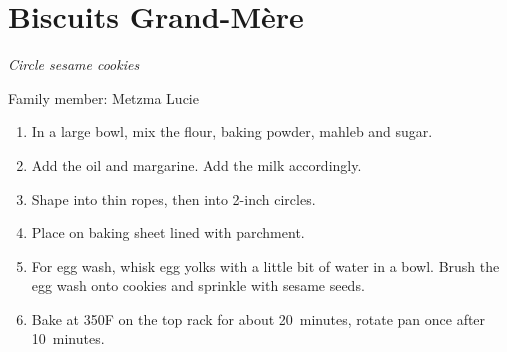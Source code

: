\chapter{Biscuits Grand-Mère}
\label{ch:biscuits_grandmere}



\textit{Circle sesame cookies}

Family member: Metzma Lucie

\begin{enumerate}
    \item In a large bowl, mix the flour, baking powder, mahleb and sugar.
    \item Add the oil and margarine. Add the milk accordingly.
    \item Shape into thin ropes, then into 2-inch circles.
    \item Place on baking sheet lined with parchment.
    \item For egg wash, whisk egg yolks with a little bit of water in a bowl. Brush the egg wash onto cookies and sprinkle with sesame seeds.
    \item Bake at 350\degree F on the top rack for about 20~minutes, rotate pan once after 10~minutes.
\end{enumerate}

